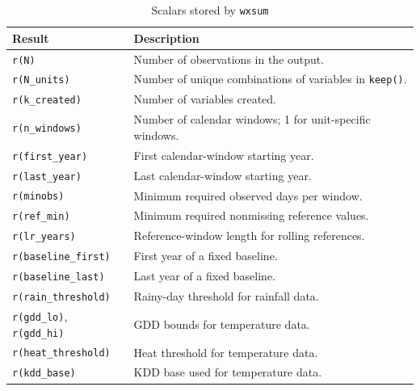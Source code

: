 \begin{table}[htbp]
	\caption{Scalars stored by \texttt{wxsum}}
	\label{tab:wxsumscalars}
	\begin{center}
		\begin{tabularx}{\textwidth}{l>{\raggedright\arraybackslash}X}
			\hline
			Result & Description \\
			\hline
			\texttt{r(N)} & Number of observations in the output. \\
			\texttt{r(N\_units)} & Number of unique combinations of variables in \texttt{keep()}. \\
			\texttt{r(k\_created)} & Number of variables created. \\
			\texttt{r(n\_windows)} & Number of calendar windows; 1 for unit-specific windows. \\
			\texttt{r(first\_year)} & First calendar-window starting year. \\
			\texttt{r(last\_year)} & Last calendar-window starting year. \\
			\texttt{r(minobs)} & Minimum required observed days per window. \\
			\texttt{r(ref\_min)} & Minimum required nonmissing reference values. \\
			\texttt{r(lr\_years)} & Reference-window length for rolling references. \\
			\texttt{r(baseline\_first)} & First year of a fixed baseline. \\
			\texttt{r(baseline\_last)} & Last year of a fixed baseline. \\
			\texttt{r(rain\_threshold)} & Rainy-day threshold for rainfall data. \\
			\texttt{r(gdd\_lo)}, \texttt{r(gdd\_hi)} & GDD bounds for temperature data. \\
			\texttt{r(heat\_threshold)} & Heat threshold for temperature data. \\
			\texttt{r(kdd\_base)} & KDD base used for temperature data. \\
			\hline
		\end{tabularx}
	\end{center}
\end{table}

